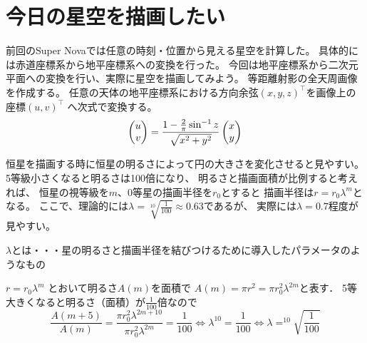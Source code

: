 \documentclass[supernova_2023]{subfiles}
\begin{document}
\chapter{今日の星空を描画したい}

前回のSuper Nova\cite{a}では任意の時刻・位置から見える星空を計算した。
具体的には赤道座標系から地平座標系への変換を行った。
今回は地平座標系から二次元平面への変換を行い、実際に星空を描画してみよう。
等距離射影の全天周画像を作成する。
任意の天体の地平座標系における方向余弦$(x,y,z)^\top$を画像上の座標$(u,v)^\top$
へ次式で変換する。
\vspace{-3mm}
\begin{align}
  \begin{pmatrix}
      u \\ v \\
  \end{pmatrix}
  =
  \frac{1-\frac{2}{\pi} \sin^{-1}{z}}{\sqrt{x^2 + y^2}}
  \begin{pmatrix}
    x \\ y \\
  \end{pmatrix}
  \notag
\end{align}

恒星を描画する時に恒星の明るさによって円の大きさを変化させると見やすい。
5等級小さくなると明るさは100倍になり、
明るさと描画面積が比例すると考えれば、
恒星の視等級を$m$、0等星の描画半径を$r_0$とすると
描画半径は$r = r_0 \lambda^m$となる。
ここで、理論的には$\lambda = \sqrt[10]{\frac{1}{100}} \approx 0.63$であるが、
実際には$\lambda = 0.7$程度が見やすい。
\begin{tcolorbox}
  \scriptsize
$\lambda$とは・・・星の明るさと描画半径を結びつけるために導入したパラメータのようなもの\par
$r = r_0 \lambda^m$ とおいて明るさ$A(m)$を面積で $ A(m) = \pi r^2 = \pi r_0^2 \lambda^{2m} $と表す． 
5等大きくなると明るさ（面積）が$\frac{1}{100}$倍なので
\[\frac{A(m+5)}{A(m)} = \frac{\pi r_0^2 \lambda^{2m+10}}{\pi r_0^2 \lambda^{2m}} = \frac{1}{100} \Leftrightarrow \lambda^{10} = \frac{1}{100} \Leftrightarrow \lambda = ^{10}\sqrt{\frac{1}{100}} \]  
\end{tcolorbox}
\end{document}
